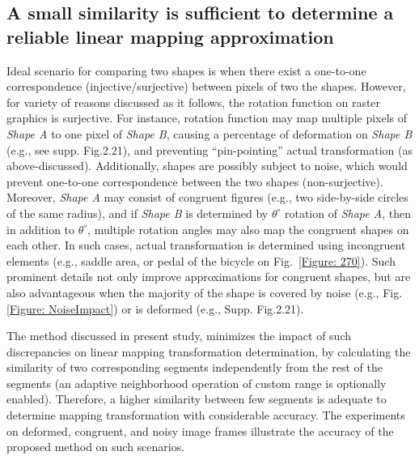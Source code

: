 \subsection{A small similarity is sufficient to determine a reliable linear mapping approximation}
Ideal scenario for comparing two shapes is when there exist a one-to-one correspondence (injective/surjective) between pixels of two the shapes. However, for variety of reasons discussed as it follows, the rotation function on raster graphics is surjective. For instance, rotation function may map multiple pixels of \textit{Shape A} to one pixel of \textit{Shape B}, causing a percentage of deformation on \textit{Shape B} (e.g., see supp. Fig.2.21), and preventing ``pin-pointing'' actual transformation (as above-discussed). Additionally, shapes are possibly subject to noise, which would prevent one-to-one correspondence between the two shapes (non-surjective). Moreover, \textit{Shape A} may consist of congruent figures (e.g., two side-by-side circles of the same radius), and if \textit{Shape B} is determined by $\theta^\circ$ rotation of \textit{Shape A}, then in addition to $\theta^\circ$, multiple rotation angles may also map the congruent shapes on each other. In such cases, actual transformation is determined using incongruent elements (e.g., saddle area, or pedal of the bicycle on Fig.~\ref{Figure: 270}). Such prominent details not only improve approximations for congruent shapes, but are also advantageous when the majority of the shape is covered by noise (e.g., Fig.\ref{Figure: NoiseImpact}) or is deformed (e.g., Supp. Fig.2.21). 

The method discussed in present study, minimizes the impact of such discrepancies on linear mapping transformation determination, by calculating the similarity of two corresponding segments independently from the rest of the segments (an adaptive neighborhood operation of custom range is optionally enabled). Therefore, a higher similarity between few segments is adequate to determine mapping transformation with considerable accuracy. The experiments on deformed, congruent, and noisy image frames illustrate the accuracy of the proposed method on such scenarios.



